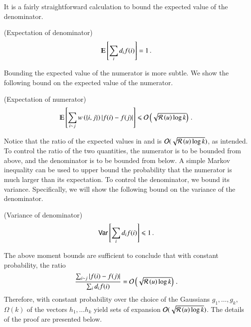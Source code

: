 \documentclass[11pt]{article}
\newcommand{\ralsymb}{\cR}
\newcommand{\ral}[1]{\ralsymb\left(#1\right)} %
\begin{document}
It is a fairly straightforward calculation to bound the expected value of the denominator.
\begin{lemma}(Expectation of denominator)
\label{lem:denom}
\[ \Ex{\sum_i d_i f(i)} = 1 \mper \]
\end{lemma}
Bounding the expected value of the numerator is more subtle.  We show the following bound on the expected
value of the numerator.
\begin{lemma}\label{lem:num} (Expectation of numerator)
\[ \Ex{\sum_{i \sim j} w\paren{\set{i,j}} \Abs{f(i) - f(j) }}  \leq  \bigo{\sqrt{ \ral{u} \log k } } \mper  \]
\end{lemma}

Notice that the ratio of the expected values in 
and  is $\bigO(\sqrt{\ral{u} \log k})$, as intended.   
To control the ratio of the two quantities, the numerator is to be
bounded from above, and the denominator is to be bounded from below.
A simple Markov inequality can be used to upper bound the probability
that the numerator is much larger than its expectation.  To control
the denominator, we bound its variance.  Specifically, we will show
the following bound on the variance of the denominator.
\begin{lemma} (Variance of denominator)
\label{lem:var}
\[ \operatorname*{{\sf Var}} \left[\sum_i d_i f(i)\right] \leqslant 1 \,. \]
\end{lemma}
The above moment bounds are sufficient to conclude that with constant
probability, the ratio 
\[ \frac{\sum_{i \sim j}\Abs{ f(i) - f(j)}}{\sum_{i} d_i f(i)} =  \bigo{\sqrt{\ral{u} \log k}} \mper \]
Therefore, with constant probability over the choice of the Gaussians
$g_1,\ldots,g_k$, $\Omega(k)$ of the vectors $h_1,\ldots h_k$ yield
sets of expansion $\bigO(\sqrt{\ral{u} \log k})$.  The details of the
proof are presented below.
\end{document}
